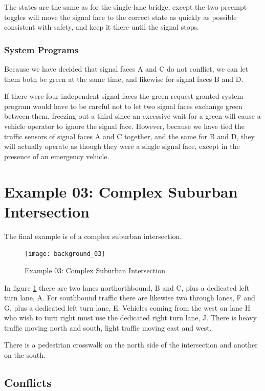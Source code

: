 \documentclass[letterpaper,twoside]{article}
\begin{document}
The states are the same as for the single-lane bridge,
except the two preempt toggles will move the signal face
to the correct state as quickly as possible consistent with
safety, and keep it there until the signal stops.

\subsubsection{System Programs}

Because we have decided that signal faces A and C do not conflict,
we can let them both be green at the same time, and likewise for
signal faces B and D.

If there were four independent signal faces the green request granted
system program would have to  be careful not to let two signal faces
exchange green between them, freezing out a third since an excessive
wait for a green will cause a vehicle operator to ignore the signal face.
However, because we have tied the traffic sensors of signal faces A and C
together, and the same for B and D, they will actually operate
as though they were a single signal face, except in the presence
of an emergency vehicle.

\section{Example 03: Complex Suburban Intersection}

The final example is of a complex suburban intersection.
\begin{figure}[htb]
  {\texttt{[image: background\_03]}}
  {\caption{Example 03: Complex Suburban Intersection}
    \label{fig:complex_intersection}}
\end{figure}

In figure \ref{fig:complex_intersection} there are two lanes
northorthbound, B and C, plus a dedicated left turn lane, A.
For southbound traffic there are likewise two through lanes,
F and G, plus a dedicated left turn lane, E.
Vehicles coming from the west on lane H who wish to turn right
must use the dedicated right turn lane, J.
There is heavy traffic moving north and south,
light traffic moving east and west.

There is a pedestrian crosswalk on the north side of the intersection
and another on the south.

\subsection{Conflicts}
\end{document}
